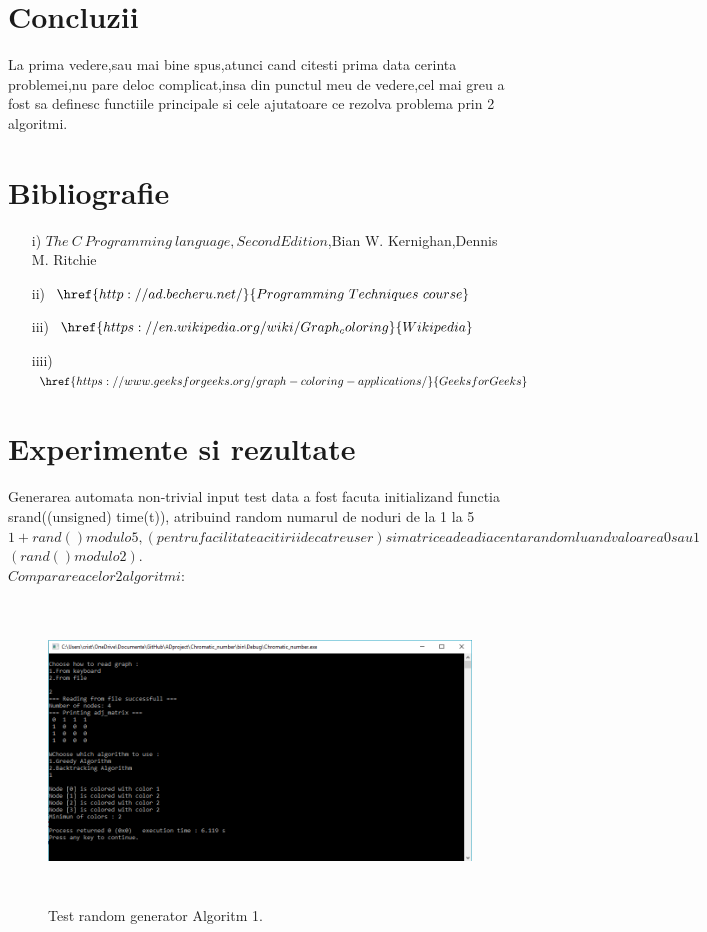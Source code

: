 \documentclass[12pt]{article}
\begin{document}
\section{Concluzii}
La prima vedere,sau mai bine spus,atunci cand citesti prima data cerinta problemei,nu pare deloc complicat,insa din punctul meu de vedere,cel mai greu a fost sa definesc functiile principale si cele ajutatoare ce rezolva problema prin 2 algoritmi.


\section{Bibliografie}

\begin{itemize}
  \item [i)] $The\ C\ Programming\ language,Second Edition$,Bian W. Kernighan,Dennis M. Ritchie
  \item [ii)] $\href{http://ad.becheru.net/}{Programming\ Techniques\ course}$
  \item [iii)] $\href{https://en.wikipedia.org/wiki/Graph_coloring}{Wikipedia}$
   \item [iiii)] $\href{https://www.geeksforgeeks.org/graph-coloring-applications/}{GeeksforGeeks}$
\end{itemize}

\pagebreak
\section{Experimente si rezultate}

Generarea automata non-trivial input test data a fost facuta initializand functia srand((unsigned) time(t)), atribuind random numarul de noduri de la 1 la 5 \leftarrow $1 + rand() modulo 5 , (pentru facilitatea citirii de catre user) si matricea de adiacenta random luand valoarea 0 sau 1 $\leftarrow $(rand() modulo 2)$.\\
$Compararea celor 2 algoritmi:$\\

\begin{figure}[ht!]
\centering
\includegraphics[width=150mm,height=80mm]{testAlgoritm1.png}
\caption{Test random generator Algoritm 1. \label{overflow}}
\end{figure}
\end{document}
